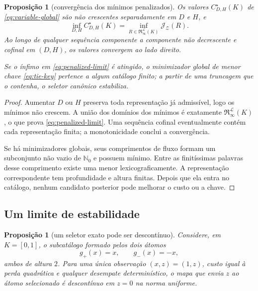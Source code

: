 \documentclass[11pt,a4paper]{article}
\newtheorem{proposition}[theorem]{Proposição}
\theoremstyle{definition}
\theoremstyle{remark}
\newcommand{\Nzero}{\mathbb{N}_0}
\newcommand{\Library}{\mathcal{L}}
\newcommand{\Representations}{\mathfrak{R}}
\newcommand{\cost}{\mathcal{J}}
\begin{document}
\begin{proposition}[convergência dos mínimos penalizados]
\label{prop:truncation-convergence}
Os valores $C_{D,H}^{\star}(K)$ de \eqref{eq:variable-global} são não
crescentes separadamente em $D$ e $H$, e
\begin{equation}
 \inf_{D,H}C_{D,H}^{\star}(K)
 =\inf_{R\in\Representations_{\infty}^{\Library}(K)}
   \cost_{\mathcal Z}(R).
 \label{eq:penalized-limit}
\end{equation}
Ao longo de qualquer sequência componente a componente não decrescente e
cofinal em $(D,H)$, os valores convergem ao lado direito.

Se o ínfimo em \eqref{eq:penalized-limit} é atingido, o minimizador global de
menor chave \eqref{eq:tie-key} pertence a algum catálogo finito; a partir de
uma truncagem que o contenha, o seletor canônico estabiliza.
\end{proposition}

\begin{proof}
Aumentar $D$ ou $H$ preserva toda representação já admissível, logo os
mínimos não crescem. A união dos domínios dos mínimos é exatamente
$\Representations_{\infty}^{\Library}(K)$, o que prova
\eqref{eq:penalized-limit}. Uma sequência cofinal eventualmente contém cada
representação finita; a monotonicidade conclui a convergência.

Se há minimizadores globais, seus comprimentos de fluxo formam um subconjunto
não vazio de $\Nzero$ e possuem mínimo. Entre as finitíssimas palavras desse
comprimento existe uma menor lexicograficamente. A representação
correspondente tem profundidade e altura finitas. Depois que ela entra no
catálogo, nenhum candidato posterior pode melhorar o custo ou a chave.
\end{proof}

\subsection{Um limite de estabilidade}

\begin{proposition}[um seletor exato pode ser descontínuo]
\label{prop:instability}
Considere, em $K=[0,1]$, o subcatálogo formado pelos dois átomos
\[
 g_+(x)=x,\qquad g_-(x)=-x,
\]
ambos de altura $2$. Para uma única observação $(x,z)=(1,z)$, custo igual à
perda quadrática e qualquer desempate determinístico, o mapa que envia $z$ ao
átomo selecionado é descontínuo em $z=0$ na norma uniforme.
\end{proposition}
\end{document}

